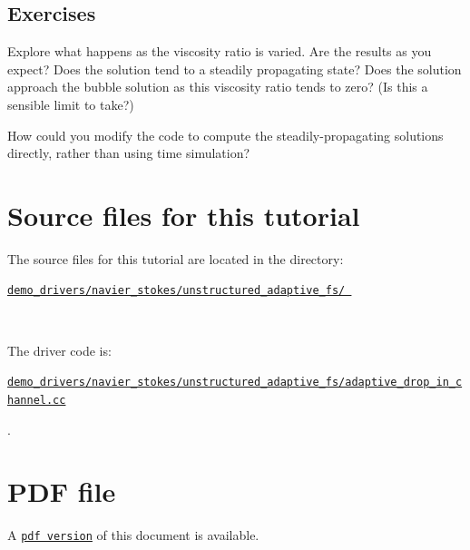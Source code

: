 \hypertarget{index_exercises}{}\subsection{Exercises}\label{index_exercises}

\begin{DoxyEnumerate}
\item Explore what happens as the viscosity ratio is varied. Are the results as you expect? Does the solution tend to a steadily propagating state? Does the solution approach the bubble solution as this viscosity ratio tends to zero? (Is this a sensible limit to take?) ~\newline
~\newline

\item How could you modify the code to compute the steadily-\/propagating solutions directly, rather than using time simulation? ~\newline
~\newline

\end{DoxyEnumerate}

 

\hypertarget{index_sources}{}\section{Source files for this tutorial}\label{index_sources}

\begin{DoxyItemize}
\item The source files for this tutorial are located in the directory\+:~\newline
~\newline
 \begin{center} \href{../../../../demo_drivers/navier_stokes/unstructured_adaptive_fs/}{\tt demo\+\_\+drivers/navier\+\_\+stokes/unstructured\+\_\+adaptive\+\_\+fs/ } \end{center} ~\newline

\item The driver code is\+: ~\newline
~\newline
 \begin{center} \href{../../../../demo_drivers/navier_stokes/unstructured_adaptive_fs/adaptive_drop_in_channel.cc}{\tt demo\+\_\+drivers/navier\+\_\+stokes/unstructured\+\_\+adaptive\+\_\+fs/adaptive\+\_\+drop\+\_\+in\+\_\+channel.\+cc} \end{center}  .
\end{DoxyItemize}



 

 \hypertarget{index_pdf}{}\section{P\+D\+F file}\label{index_pdf}
A \href{../latex/refman.pdf}{\tt pdf version} of this document is available. 

